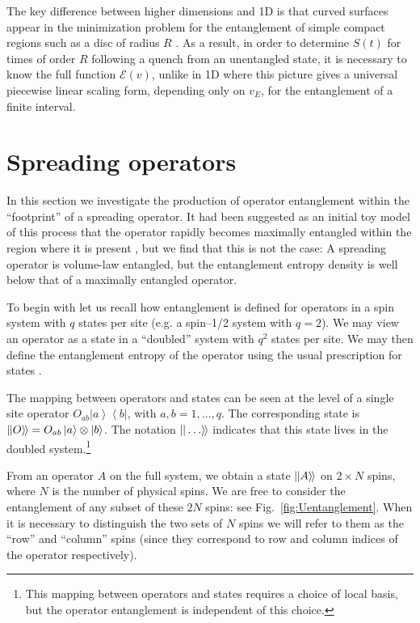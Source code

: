 \documentclass[aps,prx,twocolumn,superscriptaddress,floatfix,nofootinbib,prx]{revtex4}
\renewcommand{\>}{\right\rangle}
\newcommand{\<}{\left\langle}
\newcommand{\bra}[1]{\< #1 \right|}
\newcommand{\ket}[1]{\left| #1 \>}
\newcommand{\opket}[1]{|\hspace{-0.15mm}| #1 \rangle\hspace{-0.5mm}\rangle}
\newcommand{\lt}{\mathcal{E}}
\begin{document}
The key difference between higher dimensions and 1D is that curved surfaces appear in the minimization problem for the entanglement of simple compact regions such as a disc of radius $R$ \cite{nahum}. As a result, in order to determine $S(t)$ for times of order $R$ following a quench from an unentangled state, it is necessary to know the full function $\lt(v)$, unlike in 1D where this picture gives a universal piecewise linear scaling form, depending only on $v_E$, for the entanglement of a finite interval.

\section{Spreading operators}

\label{operator_entanglement_definition}

In this section we investigate the production of operator entanglement within the ``footprint'' of a spreading operator.  It had been suggested as an initial toy model of this process that the operator rapidly becomes maximally entangled within the region where it is present \cite{ha}, but we find that this is not the case:  A spreading operator is volume-law entangled, but the entanglement entropy density is well below that of a maximally entangled operator.

To begin with let us recall how entanglement is defined for operators in a spin system with $q$ states per site (e.g. a spin--1/2 system with $q=2$). We may view an operator as a state in a ``doubled'' system with $q^2$ states per site. We may then define the entanglement entropy of the operator using the usual prescription for states \cite{zanardi,prosenpizorn,prosenpizorn2,luitz,dubail}.

The mapping between operators and states can be seen at the level of a single site operator $O_{ab} \ket{a} \bra{b}$, with ${a,b=1,\ldots, q}$. The corresponding state is ${\opket{O} = O_{ab} \ket{a} \otimes \ket{b}}$. The notation $\opket{\ldots}$ indicates that this state lives in the doubled system.\footnote{This mapping between operators and states requires a choice of local basis, but the operator entanglement is independent of this choice.}  

From an operator $A$ on the full system, we obtain a state $\opket{A}$ on $2\times N$ spins, where $N$ is the number of physical spins.  We are free to consider the entanglement of any subset of these $2N$ spins: see Fig.~\ref{fig:Uentanglement}. When it is necessary to distinguish the two sets of $N$ spins we will refer to them as the ``row'' and ``column'' spins (since they correspond to row and column indices of the operator respectively). 
\end{document}
